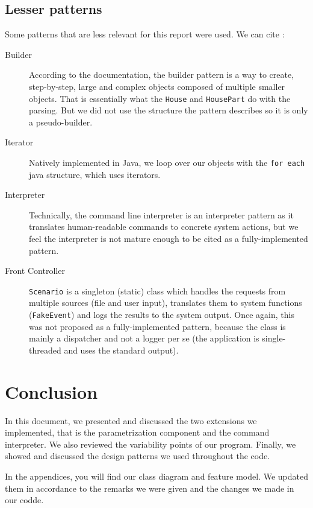       \subsection{Lesser patterns}
        Some patterns that are less relevant for this report were used. We can cite :
        \begin{description}
          \item [Builder] According to the documentation, the builder pattern is a way to create, step-by-step, large and complex objects composed of multiple smaller objects. That is essentially what the \texttt{House} and \texttt{HousePart} do with the parsing. But we did not use the structure the pattern describes so it is only a pseudo-builder.
          \item [Iterator] Natively implemented in Java, we loop over our objects with the \texttt{for each} java structure, which uses iterators.
          \item [Interpreter] Technically, the command line interpreter is an interpreter pattern as it translates human-readable commands to concrete system actions, but we feel the interpreter is not mature enough to be cited as a fully-implemented pattern.
          \item [Front Controller] \texttt{Scenario} is a singleton (static) class which handles the requests from multiple sources (file and user input), translates them to system functions (\texttt{FakeEvent}) and logs the results to the system output. Once again, this was not proposed as a fully-implemented pattern, because the class is mainly a dispatcher and not a logger per se (the application is single-threaded and uses the standard output).
        \end{description}
               
	\section{Conclusion}
		In this document, we presented and discussed the two extensions we implemented, that is the parametrization component and the command interpreter. We also reviewed the variability points of our program.
		Finally, we showed and discussed the design patterns we used throughout the code.
		
		In the appendices, you will find our class diagram and feature model. We updated them in accordance to the remarks we were given and the changes we made in our codde.


